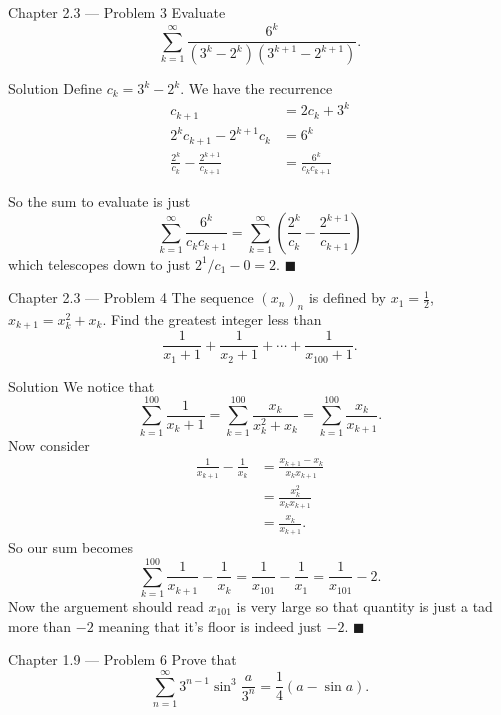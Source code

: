 \documentclass{article}
\begin{document}
\begin{problem}{Chapter 2.3 --- Problem 3}
Evaluate
$$
\sum_{k=1}^\infty \frac{6^k}{(3^k - 2^k)(3^{k+1} - 2^{k+1})}.
$$
\end{problem}

\begin{solution}{Solution}
Define $c_k = 3^k - 2^k$. We have the recurrence
\[
\begin{aligned}
c_{k+1} &= 2c_k + 3^k\\
2^k c_{k+1} - 2^{k+1} c_k &= 6^k\\
\frac{2^k}{c_k} - \frac{2^{k+1}}{c_{k+1}} &= \frac{6^k}{c_k c_{k+1}}
\end{aligned}
\]

So the sum to evaluate is just
$$
\sum_{k=1}^\infty \frac{6^k}{c_k c_{k+1}} =
\sum_{k=1}^\infty \left( \frac{2^k}{c_k} - \frac{2^{k+1}}{c_{k+1}} \right)
$$
which telescopes down to just $2^1/c_1 - 0 = 2$. $\blacksquare$
\end{solution}
\newpage

\begin{problem}{Chapter 2.3 --- Problem 4}
The sequence $(x_n)_n$ is defined by $x_1 = \frac12$,
$x_{k+1} = x_k^2 + x_k$. Find the greatest integer less than
$$
\frac{1}{x_1 + 1} + \frac{1}{x_2 + 1} + \cdots + \frac{1}{x_{100} + 1}.
$$
\end{problem}

\begin{solution}{Solution}
We notice that
$$
\sum_{k=1}^{100} \frac{1}{x_k + 1} =
\sum_{k=1}^{100} \frac{x_k}{x_k^2 + x_k} =
\sum_{k=1}^{100} \frac{x_k}{x_{k+1}}.
$$
Now consider
\[
\begin{aligned}
\frac{1}{x_{k+1}} - \frac{1}{x_k} &= \frac{x_{k+1} - x_k}{x_k x_{k+1}}\\
&= \frac{x_k^2}{x_k x_{k+1}}\\
&= \frac{x_k}{x_{k+1}}.
\end{aligned}
\]
So our sum becomes
$$
\sum_{k=1}^{100} \frac{1}{x_{k+1}} - \frac{1}{x_k} =
\frac{1}{x_{101}} - \frac{1}{x_1} = \frac{1}{x_{101}} - 2.
$$
Now the arguement should read $x_{101}$ is very large so that quantity
is just a tad more than $-2$ meaning that it's floor is indeed just $-2$.
$\blacksquare$
\end{solution}
\newpage

\begin{problem}{Chapter 1.9 --- Problem 6}
Prove that
$$
\sum_{n=1}^\infty 3^{n-1}\sin^3 \frac{a}{3^n} = \frac14 (a - \sin a).
$$
\end{problem}
\end{document}

